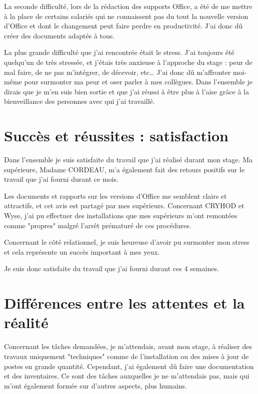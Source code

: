 La seconde difficulté, lors de la rédaction des supports Office, a été de me mettre à la place de certains salariés qui ne connaissent pas du tout la nouvelle version d’Office et dont le changement peut faire perdre en productivité. J’ai donc dû créer des documents adaptés à tous.

La plus grande difficulté que j’ai rencontrée était le stress. J’ai toujours été quelqu’un de très stressée, et j’étais très anxieuse à l’approche du stage : peur de mal faire, de ne pas m’intégrer, de décevoir, etc\dots
J’ai donc dû m’affronter moi-même pour surmonter ma peur et oser parler à mes collègues. Dans l’ensemble je dirais que je m’en suis bien sortie et que j’ai réussi à être plus à l’aise grâce à la bienveillance des personnes avec qui j’ai travaillé.


\section{Succès et réussites : satisfaction}

Dans l'ensemble je suis satisfaite du travail que j'ai réalisé durant mon stage. Ma supérieure, Madame CORDEAU, m'a également fait des retours positifs sur le travail que j'ai fourni durant ce mois.

Les documents et rapports sur les versions d'Office me semblent clairs et attractifs, et cet avis est partagé par mes supérieurs. Concernant CRYHOD et Wyse, j'ai pu effectuer des installations que mes supérieurs m'ont remontées comme "propres" malgré l'arrêt prématuré de ces procédures.

Concernant le côté relationnel, je suis heureuse d'avoir pu surmonter mon stress et cela représente un succès important à mes yeux.\newline

Je suis donc satisfaite du travail que j'ai fourni durant ces 4 semaines.


\section{Différences entre les attentes et la réalité}

Concernant les tâches demandées, je m’attendais, avant mon stage, à réaliser des travaux uniquement "techniques" comme de l’installation ou des mises à jour de postes en grande quantité. Cependant, j’ai également dû faire une documentation et des inventaires. Ce sont des tâches auxquelles je ne m’attendais pas, mais qui m’ont également formée sur d’autres aspects, plus humains.

